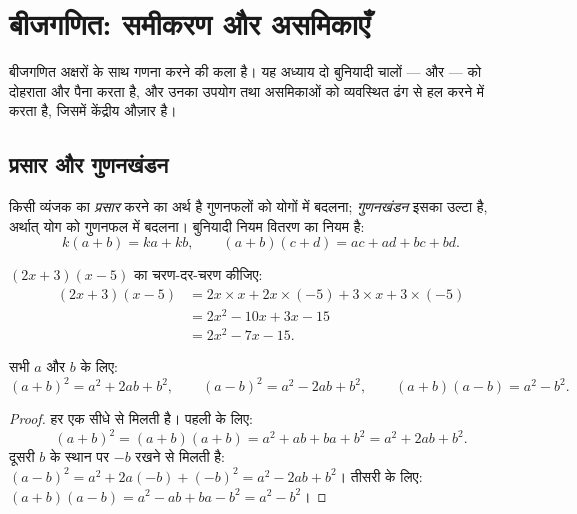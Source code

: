 \chapter{बीजगणित: समीकरण और असमिकाएँ}\label{ch:g10:algebra}

बीजगणित अक्षरों के साथ गणना करने की कला है। यह अध्याय दो बुनियादी चालों ---
 और  --- को दोहराता और पैना करता है, और उनका उपयोग  तथा
असमिकाओं को व्यवस्थित ढंग से हल करने में करता है, जिसमें  केंद्रीय
औज़ार है।

\section{प्रसार और गुणनखंडन}

\begin{definition}[प्रसार, गुणनखंडन]\label{def:g10:algebra:expand}
किसी व्यंजक का \emph{प्रसार} करने का अर्थ है गुणनफलों को योगों
में बदलना; \emph{गुणनखंडन} इसका उल्टा है, अर्थात् योग को
गुणनफल में बदलना। बुनियादी नियम वितरण का नियम है:
\[
k(a + b) = ka + kb,
\qquad
(a + b)(c + d) = ac + ad + bc + bd .
\]
\end{definition}

\begin{example}\label{ex:g10:algebra:expand}
$(2x + 3)(x - 5)$ का चरण-दर-चरण  कीजिए:
\begin{align*}
(2x + 3)(x - 5)
&= 2x \times x + 2x \times (-5) + 3 \times x + 3 \times (-5) \\
&= 2x^2 - 10x + 3x - 15 \\
&= 2x^2 - 7x - 15 .
\end{align*}
\end{example}

\begin{theorem}[उल्लेखनीय सर्वसमिकाएँ]\label{thm:g10:algebra:identities}
सभी  $a$ और $b$ के लिए:
\[
(a+b)^2 = a^2 + 2ab + b^2,
\qquad
(a-b)^2 = a^2 - 2ab + b^2,
\qquad
(a+b)(a-b) = a^2 - b^2 .
\]
\end{theorem}

\begin{proof}
हर एक सीधे  से मिलती है। पहली के लिए:
\[
(a+b)^2 = (a+b)(a+b) = a^2 + ab + ba + b^2 = a^2 + 2ab + b^2 .
\]
दूसरी $b$ के स्थान पर $-b$ रखने से मिलती है: $(a-b)^2 = a^2 + 2a(-b) +
(-b)^2 = a^2 - 2ab + b^2$। तीसरी के लिए:
$(a+b)(a-b) = a^2 - ab + ba - b^2 = a^2 - b^2$।
\end{proof}


